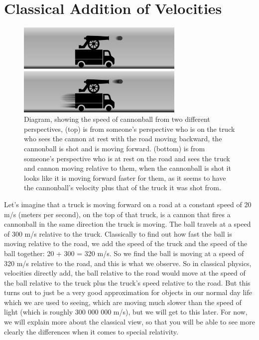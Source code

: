 \section{Classical Addition of Velocities}\label{Section classical velocity addition}

\begin{figure}[ht]
	\centering
	\includegraphics[width=8cm]{images/pdf/lorry_cannonball.pdf}
	\caption{Diagram, showing the speed of cannonball from two different perspectives, (top) is from someone's perspective who is on the truck who sees the cannon at rest with the road moving backward, the cannonball is shot and is moving forward. (bottom) is from someone's perspective who is at rest on the road and sees the truck and cannon moving relative to them, when the cannonball is shot it looks like it is moving forward faster for them, as it seems to have the cannonball's velocity plus that of the truck it was shot from.}
	\label{fig: truck cannonball}
\end{figure}

Let's imagine that a truck is moving forward on a road at a constant speed of 20 m/s (meters per second), on the top of that truck, is a cannon that fires a cannonball in the same direction the truck is moving. The ball travels at a speed of 300 m/s relative to the truck. Classically to find out how fast the ball is moving relative to the road, we add the speed of the truck and the speed of the ball together: 20 + 300 = 320 m/s. So we find the ball is moving at a speed of 320 m/s relative to the road, and this is what we observe. So in classical physics, velocities directly add, the ball relative to the road would move at the speed of the ball relative to the truck plus the truck's speed relative to the road.
But this turns out to just be a very good approximation for objects in our normal day life which we are used to seeing, which are moving much slower than the speed of light (which is roughly 300 000 000 m/s), but we will get to this later. For now, we will explain more about the classical view, so that you will be able to see more clearly the differences when it comes to special relativity.

